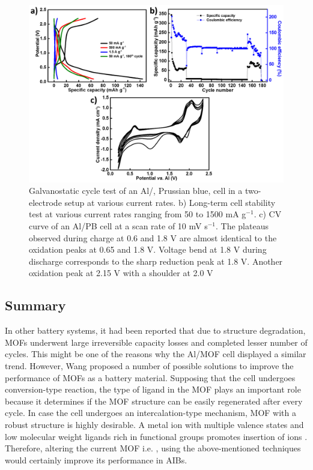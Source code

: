  \begin{figure}[tbh!]
  \centering
  \includegraphics[width=\textwidth]{Figures/chap6fig/pbcdccecv}
    \caption{Galvanostatic cycle test of an Al/, Prussian blue, cell in a two-electrode setup at various current rates. b) Long-term cell stability test at various current rates ranging from 50 to 1500 mA g$^{-1}$. c) CV curve of an Al/PB cell at a scan rate of 10 mV s$^{-1}$. The plateaus observed during charge at 0.6 and 1.8 V are almost identical to the oxidation peaks at 0.65 and 1.8 V. Voltage bend at 1.8 V during discharge corresponds to the sharp reduction peak at 1.8 V. Another oxidation peak at 2.15 V with a shoulder at 2.0 V }
  \label{Figures/chap6fig:pbcdccecv}
\end{figure}

\subsection{Summary}
In other battery systems, it had been reported that due to structure degradation, MOFs underwent large irreversible capacity losses and completed lesser number of cycles. This might be one of the reasons why the Al/MOF cell displayed a similar trend. However, Wang  proposed a number of possible solutions to improve the performance of MOFs as a battery material. Supposing that the cell undergoes conversion-type reaction, the type of ligand in the MOF plays an important role because it determines if the MOF structure can be easily regenerated after every cycle. In case the cell undergoes an intercalation-type mechanism, MOF with a robust structure is highly desirable. A metal ion with multiple valence states and low molecular weight ligands rich in functional groups promotes insertion of  ions \cite{wang_metalorganic_2016}. Therefore, altering the current MOF i.e. , using the above-mentioned techniques would certainly improve its performance in AIBs. 

